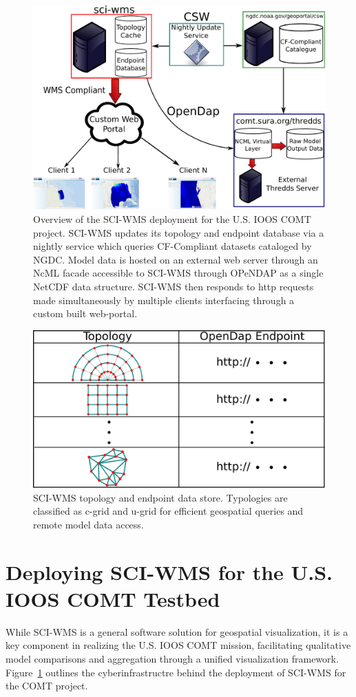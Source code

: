 \documentclass[11pt,twocolumn,twoside]{IEEEtran}
\newcommand{\comt}{COMT}
\newcommand{\ioos}{IOOS}
\newcommand{\ugrid}{u-grid}
\newcommand{\cgrid}{c-grid}
\newcommand{\ncml}{NcML}
\newcommand{\ngdc}{NGDC}
\newcommand{\opendap}{OPeNDAP}
\newcommand{\netcdf}{NetCDF}
\newcommand{\sciwms}{SCI-WMS}
\newcommand{\Sciwms}{SCI-WMS}
\begin{document}
\begin{figure}[ht!]
  \centering
  \includegraphics[width=0.7\columnwidth]{./figs/overview.pdf}
  \caption{Overview of the \sciwms{} deployment for the U.S. \ioos{}
    \comt{} project. \Sciwms{} updates its topology and endpoint
    database via a nightly service which queries CF-Compliant datasets
    cataloged by \ngdc{}. Model data is hosted on an external web
    server through an \ncml{} facade accessible to \sciwms{} through
    \opendap{} as a single \netcdf{} data structure. \Sciwms{} then
    responds to http requests made simultaneously by multiple clients
    interfacing through a custom built web-portal.}
  \label{fig:overview1}
\end{figure}

\begin{figure}[ht!]
  \centering
  \includegraphics[width=0.6\columnwidth]{./figs/sciwms_db_topology_endpoints.pdf}
  \caption{\Sciwms{} topology and endpoint data store. Typologies are
    classified as \cgrid{} and \ugrid{} for efficient geospatial
    queries and remote model data access.}
  \label{fig:sciwms_topology_endpoints}
\end{figure}

\section{Deploying \sciwms{} for the U.S. \ioos{} \comt{} Testbed}
While \sciwms{} is a general software solution for geospatial
visualization, it is a key component in realizing the U.S. \ioos{}
\comt{} mission, facilitating qualitative model comparisons and
aggregation through a unified visualization
framework. Figure~\ref{fig:overview1} outlines the cyberinfrastructre
behind the deployment of \sciwms{} for the \comt{} project.
\end{document}
